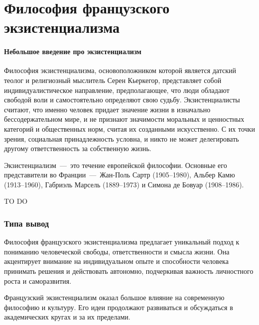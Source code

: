 \documentclass{bmstu}
\begin{document}
\chapter*{Философия французского экзистенциализма}

\subsubsection*{Небольшое введение про экзистенциализм}

Философия экзистенциализма, основоположником которой является датский теолог и религиозный мыслитель Серен Кьеркегор, представляет собой индивидуалистическое направление, предполагающее, что люди обладают свободой воли и самостоятельно определяют свою судьбу. Экзистенциалисты считают, что именно человек придает значение жизни в изначально бессодержательном мире, и не признают значимости моральных и ценностных категорий и общественных норм, считая их созданными искусственно. С их точки зрения, социальная принадлежность условна, и никто не может делегировать другому ответственность за собственную жизнь.

Экзистенциализм~---~это течение европейской философии. Основные его представители во Франции~---~Жан-Поль Сартр (1905--1980), Альбер Камю (1913--1960), Габриэль Марсель (1889--1973) и Симона де Бовуар (1908--1986).

TO DO

\subsection*{Типа вывод}

Философия французского экзистенциализма предлагает уникальный подход к пониманию человеческой свободы, ответственности и смысла жизни. Она акцентирует внимание на индивидуальном опыте и способности человека принимать решения и действовать автономно, подчеркивая важность личностного роста и саморазвития.

Французский экзистенциализм оказал большое влияние на современную философию и культуру. Его идеи продолжают развиваться и обсуждаться в академических кругах и за их пределами.
\end{document}

